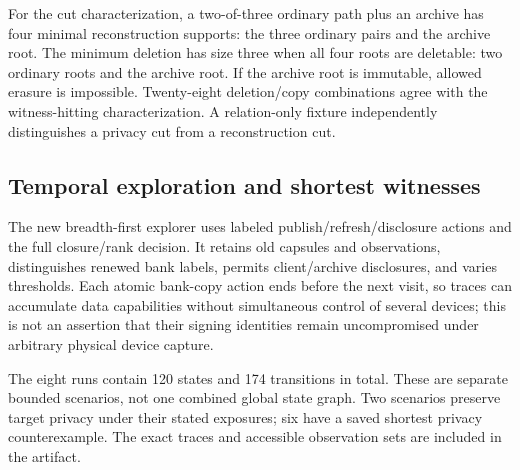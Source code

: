 \documentclass[pdflatex,sn-mathphys-num]{sn-jnl}
\theoremstyle{plain}
\theoremstyle{definition}
\begin{document}
For the cut characterization, a two-of-three ordinary path plus an archive has four minimal reconstruction supports: the three ordinary pairs and the archive root. The minimum deletion has size three when all four roots are deletable: two ordinary roots and the archive root. If the archive root is immutable, allowed erasure is impossible. Twenty-eight deletion/copy combinations agree with the witness-hitting characterization. A relation-only fixture independently distinguishes a privacy cut from a reconstruction cut.

\subsection{Temporal exploration and shortest witnesses}\label{sec:temporal-evidence}
The new breadth-first explorer uses labeled publish/refresh/disclosure actions and the full closure/rank decision. It retains old capsules and observations, distinguishes renewed bank labels, permits client/archive disclosures, and varies thresholds. Each atomic bank-copy action ends before the next visit, so traces can accumulate data capabilities without simultaneous control of several devices; this is not an assertion that their signing identities remain uncompromised under arbitrary physical device capture.

The eight runs contain 120 states and 174 transitions in total. These are separate bounded scenarios, not one combined global state graph. Two scenarios preserve target privacy under their stated exposures; six have a saved shortest privacy counterexample. The exact traces and accessible observation sets are included in the artifact.
\end{document}
